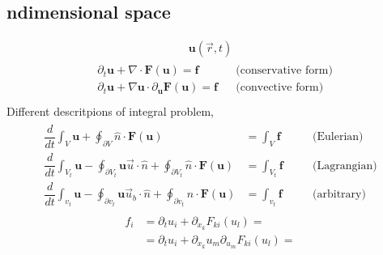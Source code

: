 \documentclass[letterpaper,10pt,english]{jupyterBook}
\begin{document}
\subsection{n\sphinxhyphen{}dimensional space}
\label{\detokenize{ch/pde/hyperbolic-dimensions:n-dimensional-space}}\begin{equation*}
\begin{split}\mathbf{u}(\vec{r}, t)\end{split}
\end{equation*}\begin{equation*}
\begin{split}\begin{aligned}
  & \partial_t \mathbf{u} + \nabla \cdot \mathbf{F}(\mathbf{u}) = \mathbf{f}  && \text{(conservative form)} \\
  & \partial_t \mathbf{u} + \nabla \mathbf{u} \cdot \partial_{\mathbf{u}} \mathbf{F}(\mathbf{u}) = \mathbf{f}  && \text{(convective form)} \\
\end{aligned}\end{split}
\end{equation*}
\sphinxAtStartPar
Different descritpions of integral problem,
\begin{equation*}
\begin{split}\begin{aligned}
  \dfrac{d}{dt} \int_V \mathbf{u} + \oint_{\partial V} \hat{n} \cdot \mathbf{F}(\mathbf{u}) & = \int_V \mathbf{f} && \quad \text{(Eulerian)} \\
  \dfrac{d}{dt} \int_{V_t} \mathbf{u} - \oint_{\partial V_t} \mathbf{u} \vec{u} \cdot \hat{n} + \oint_{\partial V_t} \hat{n} \cdot \mathbf{F}(\mathbf{u}) & = \int_{V_t} \mathbf{f} && \quad \text{(Lagrangian)} \\
  \dfrac{d}{dt} \int_{v_t} \mathbf{u} - \oint_{\partial v_t} \mathbf{u} \vec{u}_b \cdot \hat{n} + \oint_{\partial v_t} \hat{n} \cdot \mathbf{F}(\mathbf{u}) & = \int_{v_t} \mathbf{f} && \quad \text{(arbitrary)}
\end{aligned}\end{split}
\end{equation*}
\sphinxAtStartPar
{} 
\begin{equation*}
\begin{split}\begin{aligned} 
  f_i
  & = \partial_t u_i + \partial_{x_k} F_{ki} (u_l) = \\
  & = \partial_t u_i + \partial_{x_k} u_m \partial_{u_m} F_{ki} (u_l) = \\
\end{aligned}\end{split}
\end{equation*}\label{ch/pde/hyperbolic-dimensions:example-4}
\end{document}
